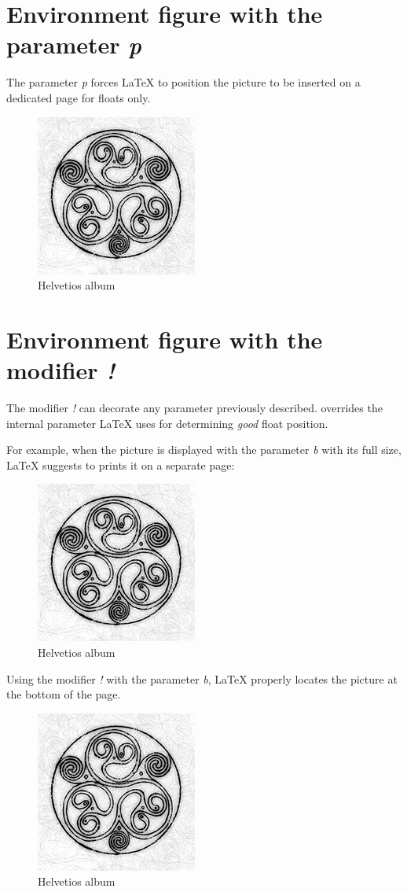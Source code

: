 \documentclass{article}
\begin{document}
\clearpage

\section*{Environment figure with the parameter \emph{p}}

The parameter \emph{p} forces \LaTeX{} to position the picture to be inserted on a dedicated page for floats only.


\begin{figure}[p]
	\centering
	\includegraphics[scale=0.5]{helvetios}
	\caption{Helvetios album}
\end{figure}

\clearpage

\section*{Environment figure with the modifier \emph{!}}

The modifier \emph{!} can decorate any parameter previously described. overrides the internal parameter \LaTeX{} uses for determining \textit{good} float position.

For example, when the picture is displayed with the parameter \emph{b} with its full size, \LaTeX{} suggests to prints it on a separate page:

\begin{figure}[b]
	\centering
	\includegraphics{helvetios}
	\caption{Helvetios album}
\end{figure}

\clearpage

Using the modifier \emph{!} with the parameter \emph{b}, \LaTeX{} properly locates the picture at the bottom of the page.

\begin{figure}[!b]
	\centering
	\includegraphics{helvetios}
	\caption{Helvetios album}
\end{figure}
\end{document}
